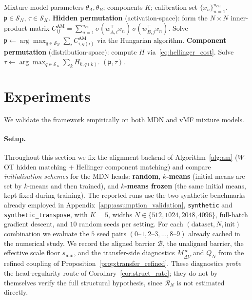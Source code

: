 \documentclass[11pt]{article}
\newcommand{\cS}{\mathcal{S}}
\newcommand{\cB}{\mathcal{B}}
\newcommand{\nperm}{\mathfrak{p}}  %
\begin{document}
\begin{algorithm}[t]
\caption{Activation Matching with Hellinger Head (AM)}
\label{alg:am}
\begin{algorithmic}[1]
\REQUIRE Mixture-model parameters $\theta_A, \theta_B$; components $K$;
  calibration set $\{x_n\}_{n=1}^{n_{\mathrm{cal}}}$.
\ENSURE $\nperm \in \cS_N$, $\tau \in \cS_K$.
\STATE \textbf{Hidden permutation} (activation-space):
  form the $N \times N$ inner-product matrix
  $C_{ij}^{\mathrm{AM}} = \sum_{n=1}^{n_{\mathrm{cal}}} \sigma(w_{A,i}^\top x_n)\,\sigma(w_{B,j}^\top x_n)$.
  Solve $\nperm \leftarrow \arg\max_{q \in \cS_N}\sum_i C_{i,q(i)}^{\mathrm{AM}}$
  via the Hungarian algorithm.
  \hfill{}
\STATE \textbf{Component permutation} (distribution-space):
  compute $H$ via~\eqref{eq:hellinger_cost}.
  Solve $\tau \leftarrow \arg\max_{q \in \cS_K}\sum_k H_{k,q(k)}$.
  \hfill{}
\RETURN $(\nperm, \tau)$.
\end{algorithmic}
\end{algorithm}

\section{Experiments}\label{sec:experiments}

We validate the framework empirically on both MDN and vMF mixture
models.

\paragraph{Setup.}
Throughout this section we fix the alignment backend of
Algorithm~\ref{alg:am} ($W$-OT hidden matching $+$ Hellinger
component matching) and compare \emph{initialisation schemes}
for the MDN heads:
\textbf{random}, \textbf{$k$-means} (initial means are set by
$k$-means and then trained), and \textbf{$k$-means frozen}
(the same initial means, kept fixed during training).
The reported runs use the two synthetic benchmarks already employed in
Appendix~\ref{app:assumption_validation},
\texttt{synthetic} and \texttt{synthetic\_transpose},
with $K=5$, widths
$N \in \{512, 1024, 2048, 4096\}$,
full-batch gradient descent, and $10$ random seeds per setting.
For each $(\text{dataset}, N, \text{init})$ combination we evaluate
the $5$ seed pairs
$(0\text{--}1, 2\text{--}3, \ldots, 8\text{--}9)$
already cached in the numerical study.
We record the aligned barrier $\cB$, the unaligned barrier,
the effective scale floor $s_{\min}$, and the transfer-side
diagnostics $M_{\Delta \tilde V}^\infty$ and $Q_N$ from the refined
coupling of Proposition~\ref{prop:transfer_refined}.
These diagnostics \emph{probe} the head-regularity route of
Corollary~\ref{cor:struct_rate}; they do not by themselves verify the
full structural hypothesis, since $\mathcal{R}_N$ is not estimated
directly.
\end{document}
